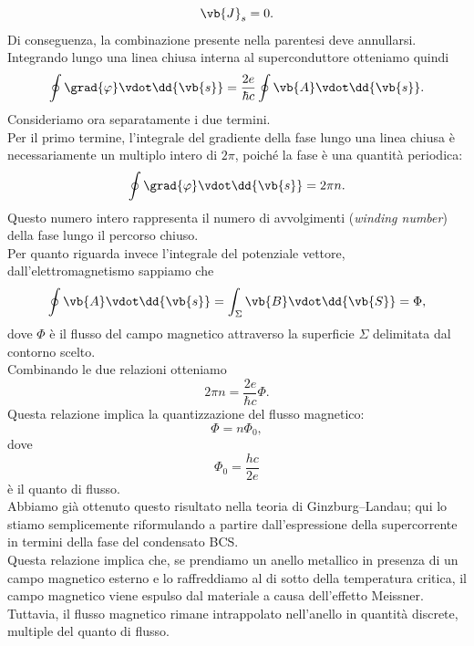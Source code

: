 \[
\vb{J}_s=0.
\]
Di conseguenza, la combinazione presente nella parentesi deve annullarsi. Integrando lungo una linea chiusa interna al superconduttore otteniamo quindi
\begin{equation*}
    \oint
    \grad{\varphi}\vdot\dd{\vb{s}}
    =
    \frac{2e}{\hbar c}
    \oint
    \vb{A}\vdot\dd{\vb{s}}.
\end{equation*}
Consideriamo ora separatamente i due termini.\\
Per il primo termine, l'integrale del gradiente della fase lungo una linea chiusa è necessariamente un multiplo intero di $2\pi$, poiché la fase è una quantità periodica:
\begin{equation*}
    \oint
    \grad{\varphi}\vdot\dd{\vb{s}}
    =
    2\pi n.
\end{equation*}
Questo numero intero rappresenta il numero di avvolgimenti (\textit{winding number}) della fase lungo il percorso chiuso.\\
Per quanto riguarda invece l'integrale del potenziale vettore, dall'elettromagnetismo sappiamo che
\begin{equation*}
    \oint
    \vb{A}\vdot\dd{\vb{s}}
    =
    \int_{\Sigma}
    \vb{B}\vdot\dd{\vb{S}}
    =
    \Phi,
\end{equation*}
dove $\Phi$ è il flusso del campo magnetico attraverso la superficie $\Sigma$ delimitata dal contorno scelto.\\
Combinando le due relazioni otteniamo
\begin{equation*}
    2\pi n
    =
    \frac{2e}{\hbar c}\Phi.
\end{equation*}
Questa relazione implica la quantizzazione del flusso magnetico:
\begin{equation*}
    \Phi
    =
    n\Phi_0,
\end{equation*}
dove
\[
\Phi_0=\frac{hc}{2e}
\]
è il quanto di flusso.\\
Abbiamo già ottenuto questo risultato nella teoria di Ginzburg--Landau; qui lo stiamo semplicemente riformulando a partire dall'espressione della supercorrente in termini della fase del condensato BCS.\\
Questa relazione implica che, se prendiamo un anello metallico in presenza di un campo magnetico esterno e lo raffreddiamo al di sotto della temperatura critica, il campo magnetico viene espulso dal materiale a causa dell'effetto Meissner. Tuttavia, il flusso magnetico rimane intrappolato nell'anello in quantità discrete, multiple del quanto di flusso.\\
